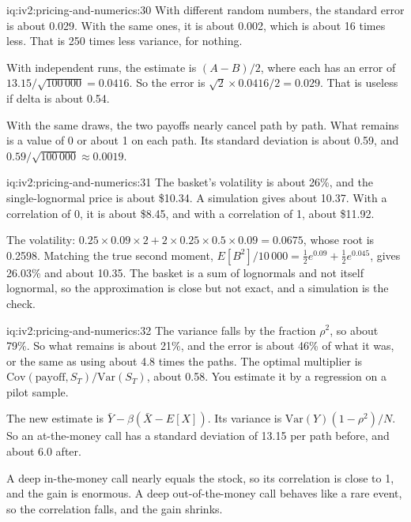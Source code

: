 \begin{solution}{iq:iv2:pricing-and-numerics:30}
With different random numbers, the standard error is about 0.029. With the same ones, it is about 0.002, which is about 16 times less. That is 250 times less variance, for nothing.

With independent runs, the estimate is $(A - B)/2$, where each has an error of $13.15/\sqrt{100\,000} = 0.0416$. So the error is $\sqrt 2 \times 0.0416/2 = 0.029$. That is useless if delta is about 0.54.

With the same draws, the two payoffs nearly cancel path by path. What remains is a value of 0 or about 1 on each path. Its standard deviation is about 0.59, and $0.59/\sqrt{100\,000} \approx 0.0019$.

\end{solution}

\begin{solution}{iq:iv2:pricing-and-numerics:31}
The basket's volatility is about 26\%, and the single-lognormal price is about \$10.34. A simulation gives about 10.37. With a correlation of 0, it is about \$8.45, and with a correlation of 1, about \$11.92.

The volatility: $0.25 \times 0.09 \times 2 + 2 \times 0.25 \times 0.5 \times 0.09 = 0.0675$, whose root is 0.2598. Matching the true second moment, $E[B^2]/10\,000 = \tfrac12e^{0.09} + \tfrac12e^{0.045}$, gives 26.03\% and about 10.35. The basket is a sum of lognormals and not itself lognormal, so the approximation is close but not exact, and a simulation is the check.

\end{solution}

\begin{solution}{iq:iv2:pricing-and-numerics:32}
The variance falls by the fraction $\rho^2$, so about 79\%. So what remains is about 21\%, and the error is about 46\% of what it was, or the same as using about 4.8 times the paths. The optimal multiplier is $\text{Cov}(\text{payoff}, S_T)/\text{Var}(S_T)$, about 0.58. You estimate it by a regression on a pilot sample.

The new estimate is $\bar Y - \beta(\bar X - E[X])$. Its variance is $\text{Var}(Y)(1 - \rho^2)/N$. So an at-the-money call has a standard deviation of 13.15 per path before, and about 6.0 after.

A deep in-the-money call nearly equals the stock, so its correlation is close to 1, and the gain is enormous. A deep out-of-the-money call behaves like a rare event, so the correlation falls, and the gain shrinks.

\end{solution}

